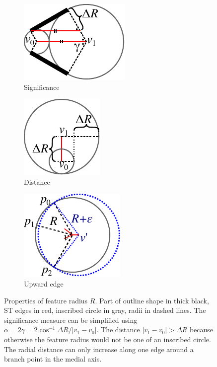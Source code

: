 \begin{figure} \centering
\newlength{\significancePropertiesHeight}
\setlength{\significancePropertiesHeight}{.25\columnwidth}
\begin{subfigure}{0.35\columnwidth} \centering
\includegraphics[height=\significancePropertiesHeight]{sources/method/distance_based_angles.pdf}
\caption{Significance}
\label{distance_based_angles}
\end{subfigure}
\begin{subfigure}{0.3\columnwidth} \centering
\includegraphics[height=\significancePropertiesHeight]{sources/method/distance_ratio_limit.pdf}
\caption{Distance}
\label{distance_ratio_limit}
\end{subfigure}
\begin{subfigure}{0.3\columnwidth} \centering
\includegraphics[height=\significancePropertiesHeight]{sources/method/branch_upward_edge_property.pdf}
\caption{Upward edge}
\label{branch_upward_edge_property}
\end{subfigure}
\caption{
Properties of feature radius $R$.
Part of outline shape in thick black,
ST edges in red,
inscribed circle in gray,
radii in dashed lines.
 The significance measure can be simplified using $\alpha = 2 \gamma = 2 \cos^{-1} \Delta R / |v_1 - v_0|$.
 The distance $|v_1 - v_0| > \Delta R$ because otherwise the feature radius would not be one of an inscribed circle.
 The radial distance can only increase along one edge around a branch point in the medial axis.
}
\end{figure}





